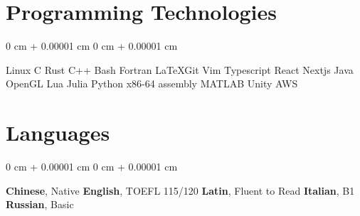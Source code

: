 \documentclass[10pt, a4paper]{article}
\newenvironment{onecolentry}{
    \begin{adjustwidth}{
        0 cm + 0.00001 cm
    }{
        0 cm + 0.00001 cm
    }
}{
    \end{adjustwidth}
} %
\begin{document}
	\section{Programming Technologies}
        \begin{onecolentry}
			Linux \textbullet{} C \textbullet{} Rust \textbullet{} C++ \textbullet{} Bash \textbullet{} Fortran \textbullet{} \LaTeX \textbullet Git \textbullet Vim \textbullet Typescript \textbullet React \textbullet Nextjs \textbullet Java
			OpenGL \textbullet Lua \textbullet{} Julia \textbullet Python \textbullet{} x86-64 assembly \textbullet{} MATLAB \textbullet{} Unity \textbullet AWS

        \end{onecolentry}

        \vspace{0.2 cm}

	\section{Languages}
	\begin{onecolentry}
		\textbf{Chinese}, Native
		\textbullet{} 
		\textbf{English}, TOEFL 115/120 
		\textbullet{} 
		\textbf{Latin}, Fluent to Read
		\textbullet{} 
		\textbf{Italian}, B1
		\textbullet{}
		\textbf{Russian}, Basic 
	\end{onecolentry}
\end{document}
